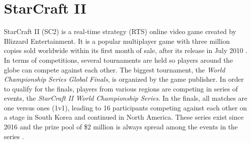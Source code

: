 \section[head={SC2}, tocentry={StarCraft II}, reference={SC2}]{StarCraft II} \label{sec:sc2}
StarCraft II (SC2) is a real-time strategy (RTS) online video game created by Blizzard Entertainment. It is a popular multiplayer game with three million copies sold worldwide within its first month of sale, after its release in July 2010 \cite{blizzard2010sales}. In terms of competitions, several tournaments are held so players around the globe can compete against each other. The biggest tournament, the \textit{World Championship Series Global Finals}, is organized by the game publisher. In order to qualify for the finals, players from various regions are competing in series of events, the \textit{StarCraft II World Championship Series}. In the finals, all matches are one versus ones (1v1), leading to 16 participants competing against each other on a stage in South Korea and continued in North America. These series exist since 2016 and the prize pool of \$2 million is always spread among the events in the series \cite{MajorTou70:online}.

